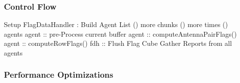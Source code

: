 \subsubsection{Control Flow}



\begin{algorithm}
  \SetLine
  \dontprintsemicolon
  \vspace{0.5cm} 
  \vspace{0.5cm} 
  {Setup FlagDataHandler :} \;
  {Build Agent List }\;
  \While () { more chunks }
  {
    \While () { more times }
    {
      \ForAll () { agents }
      {
        {
          {agent :: pre-Process current buffer}\;
             {
               {
                  {agent :: computeAntennaPairFlags()}\;
               }
             }
             {
               {
                {agent :: computeRowFlags() }\;
               }
             }
        }
      }
    }
    {fdh :: Flush Flag Cube}\;
  }
  {Gather Reports from all agents} \;
\end{algorithm}





\subsubsection{Performance Optimizations}

%
%
%


